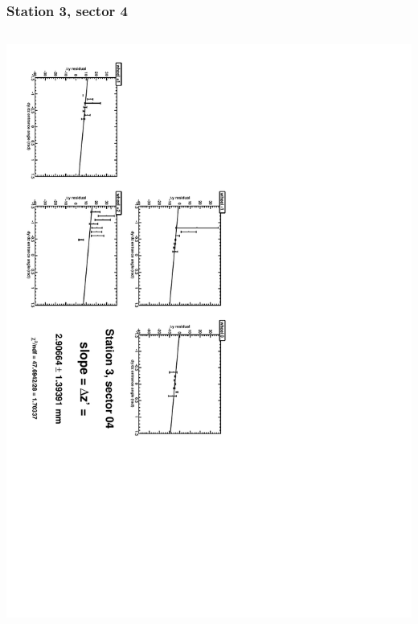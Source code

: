 \documentclass[compress]{beamer}
\begin{document}
\begin{frame}
\frametitle{Station 3, sector 4}
\begin{columns}
\includegraphics[height=\linewidth, angle=90]{zfits/zfit_3_04.pdf}


\end{columns}
\end{frame}
\end{document}
